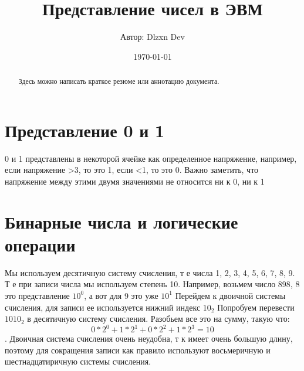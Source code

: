 \documentclass[12pt,a4paper]{article}
\begin{document}
\title{Представление чисел в ЭВМ}
\author{Автор: Dlzxn Dev}
\date{\today}
\maketitle

\begin{abstract}
Здесь можно написать краткое резюме или аннотацию документа.
\end{abstract}

\section{Представление 0 и 1}

    0 и 1 представлены в некоторой ячейке как определенное напряжение, например,
    если напряжение >3, то это 1, если <1, то это 0. Важно заметить, что напряжение
    между этими двумя значениями не относится ни к 0, ни к 1 \
\section{Бинарные числа и логические операции}
Мы используем десятичную систему счисления, т е числа 1, 2, 3, 4, 5, 6, 7, 8, 9. Т е при записи числа мы используем степень 10.
    Например, возьмем число 898, 8 это представление \(10^0\), а вот для 9 это уже \(10^1\)
    Перейдем к двоичной системы счисления, для записи ее используется нижний индекс \(10_2\)
    Попробуем перевести \(1010_2\) в десятичную систему счисления. Разобьем все это на сумму, такую что:
    \[0*2^0 + 1*2^1 + 0*2^2+1*2^3 = 10\].
    Двоичная система счисления очень неудобна,
    т к имеет очень большую длину, поэтому для сокращения записи как правило
    используют восьмеричную и шестнадцатиричную системы счисления.
\end{document}
